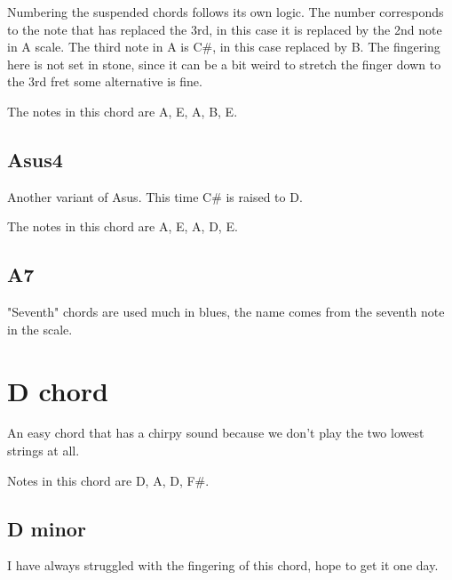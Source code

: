 \documentclass[11pt]{book}
\begin{document}
    Numbering the suspended chords follows its own logic.
    The number corresponds to the note that has replaced the 3rd, in this case it is replaced by the 2nd note in A scale.
    The third note in A is C\#, in this case replaced by B.
    The fingering here is not set in stone, since it can be a bit weird to stretch the finger down to the 3rd fret some alternative is fine.


    \chordscheme[
    name = Asus2,
    finger = {2/4:2,2/3:3},
    mute = {6},
    ring = {5,2,1}
    ]

    The notes in this chord are A, E, A, B, E.

    \subsection{Asus4}
    Another variant of Asus.
    This time C\# is raised to D.

    \chordscheme[
    name = Asus4,
    finger = {2/4:2, 2/3:3, 3/2:(3/4)},
    mute = {6},
    ring = {5,1}
    ]

    The notes in this chord are A, E, A, D, E.

    \subsection{A7}
    "Seventh" chords are used much in blues, the name comes from the seventh note in the scale.

    \chordscheme[
    name = A7,
    finger = {2/4:2, 3/2:4},
    mute = {6},
    ring = {5,3,1}
    ]


    \section{D chord}
    An easy chord that has a chirpy sound because we don't play the two lowest strings at all.

    \chordscheme[
    name = D,
    finger = {2/3:1, 3/2:3, 2/1:2},
    ring = {4},
    mute = {6,5}
    ]

    Notes in this chord are D, A, D, F\#.

    \subsection{D minor}
    I have always struggled with the fingering of this chord, hope to get it one day.

    \chordscheme[
    name = Dm,
    finger = {2/3:2, 3/2:3, 1/1:1},
    ring = {4},
    mute = {5,6}
    ]
\end{document}
